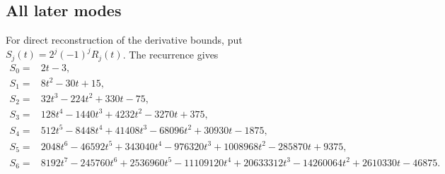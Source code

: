 \documentclass[11pt]{article}
\theoremstyle{remark}
\numberwithin{equation}{section}
\begin{document}
\subsection{All later modes}

For direct reconstruction of the derivative bounds, put
\(S_j(t)=2^j(-1)^jR_j(t)\). The recurrence gives
\begin{align*}
S_0={}&2t-3,\\
S_1={}&8t^2-30t+15,\\
S_2={}&32t^3-224t^2+330t-75,\\
S_3={}&128t^4-1440t^3+4232t^2-3270t+375,\\
S_4={}&512t^5-8448t^4+41408t^3-68096t^2+30930t-1875,\\
S_5={}&2048t^6-46592t^5+343040t^4-976320t^3
       +1008968t^2-285870t+9375,\\
S_6={}&8192t^7-245760t^6+2536960t^5-11109120t^4
       +20633312t^3-14260064t^2+2610330t-46875.
\end{align*}
\end{document}
